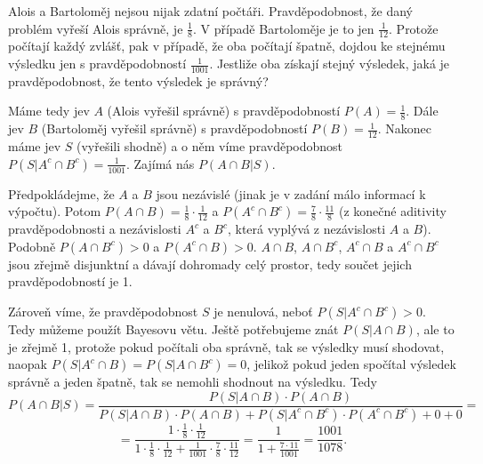 \documentclass[12pt]{article}					%
\begin{document}
\pagebreak
\begin{priklad}
	Alois a Bartoloměj nejsou nijak zdatní počtáři. Pravděpodobnost, že daný problém vyřeší Alois správně, je $\frac{1}{8}$. V případě Bartoloměje je to jen $\frac{1}{12}$. Protože počítají každý zvlášť, pak v případě, že oba počítají špatně, dojdou ke stejnému výsledku jen s pravděpodobností $\frac{1}{1001}$. Jestliže oba získají stejný výsledek, jaká je pravděpodobnost, že tento výsledek je správný?

	\begin{reseni}
		Máme tedy jev $A$ (Alois vyřešil správně) s pravděpodobností $P(A) = \frac{1}{8}$. Dále jev $B$ (Bartoloměj vyřešil správně) s pravděpodobností $P(B) = \frac{1}{12}$. Nakonec máme jev $S$ (vyřešili shodně) a o něm víme pravděpodobnost $P(S|A^c \cap B^c) = \frac{1}{1001}$. Zajímá nás $P(A \cap B|S)$.

		Předpokládejme, že $A$ a $B$ jsou nezávislé (jinak je v zadání málo informací k výpočtu). Potom $P(A \cap B) = \frac{1}{8}·\frac{1}{12}$ a $P(A^c \cap B^c) = \frac{7}{8}·\frac{11}{8}$ (z konečné aditivity pravděpodobnosti a nezávislosti $A^c$ a $B^c$, která vyplývá z nezávislosti $A$ a $B$). Podobně $P(A \cap B^c) > 0$ a $P(A^c \cap B) > 0$. $A \cap B$, $A \cap B^c$, $A^c \cap B$ a $A^c \cap B^c$ jsou zřejmě disjunktní a dávají dohromady celý prostor, tedy součet jejich pravděpodobností je 1.

		Zároveň víme, že pravděpodobnost $S$ je nenulová, neboť $P(S|A^c \cap B^c) > 0$. Tedy můžeme použít Bayesovu větu. Ještě potřebujeme znát $P(S|A \cap B)$, ale to je zřejmě 1, protože pokud počítali oba správně, tak se výsledky musí shodovat, naopak $P(S|A^c \cap B) = P(S|A \cap B^c) = 0$, jelikož pokud jeden spočítal výsledek správně a jeden špatně, tak se nemohli shodnout na výsledku. Tedy
		$$ P(A \cap B|S) = \frac{P(S | A \cap B)·P(A \cap B)}{P(S | A \cap B)·P(A \cap B) + P(S | A^c \cap B^c)·P(A^c \cap B^c) + 0 + 0} = $$
		$$ = \frac{1·\frac{1}{8}·\frac{1}{12}}{1·\frac{1}{8}·\frac{1}{12} + \frac{1}{1001}·\frac{7}{8}·\frac{11}{12}} = \frac{1}{1 + \frac{7·11}{1001}} = \frac{1001}{1078}. $$
	\end{reseni}
\end{priklad}
\end{document}
